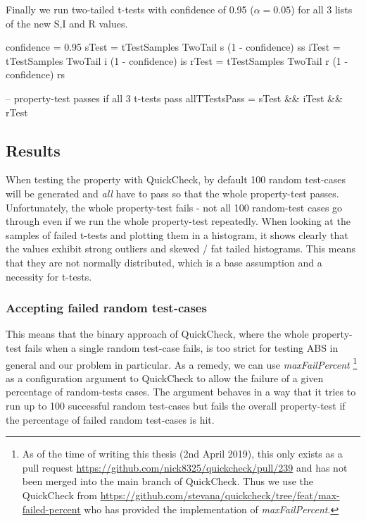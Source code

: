 Finally we run two-tailed t-tests with confidence of 0.95 ($\alpha = 0.05$) for all 3 lists of the new S,I and R values.

\begin{HaskellCode}
confidence = 0.95
sTest = tTestSamples TwoTail s (1 - confidence) ss
iTest = tTestSamples TwoTail i (1 - confidence) is
rTest = tTestSamples TwoTail r (1 - confidence) rs

-- property-test passes if all 3 t-tests pass
allTTestsPass = sTest && iTest && rTest
\end{HaskellCode}

\subsection{Results}
When testing the property with QuickCheck, by default 100 random test-cases will be generated and \textit{all} have to pass so that the whole property-test passes. Unfortunately, the whole property-test fails - not all 100 random-test cases go through even if we run the whole property-test repeatedly. When looking at the samples of failed t-tests and plotting them in a histogram, it shows clearly that the values exhibit strong outliers and skewed / fat tailed histograms. This means that they are not normally distributed, which is a base assumption and a necessity for t-tests. 

\subsubsection{Accepting failed random test-cases}
This means that the binary approach of QuickCheck, where the whole property-test fails when a single random test-case fails, is too strict for testing ABS in general and our problem in particular. As a remedy, we can use \textit{maxFailPercent} \footnote{As of the time of writing this thesis (2nd April 2019), this only exists as a pull request \url{https://github.com/nick8325/quickcheck/pull/239} and has not been merged into the main branch of QuickCheck. Thus we use the QuickCheck from \url{https://github.com/stevana/quickcheck/tree/feat/max-failed-percent} who has provided the implementation of \textit{maxFailPercent}.} as a configuration argument to QuickCheck to allow the failure of a given percentage of random-tests cases. The argument behaves in a way that it tries to run up to 100 successful random test-cases but fails the overall property-test if the percentage of failed random test-cases is hit.

